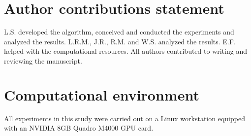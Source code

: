 \documentclass[12pt,letterpaper]{article}
\begin{document}
\section*{Author contributions statement}
L.S. developed the algorithm, conceived and conducted the experiments and analyzed the results. L.R.M., J.R., R.M. and W.S. analyzed the results. E.F. helped with the computational resources. All authors contributed to writing and reviewing the manuscript.

\section*{Computational environment}
All experiments in this study were carried out on a Linux workstation equipped with an NVIDIA 8GB Quadro M4000 GPU card.

\printbibliography
\end{document}
